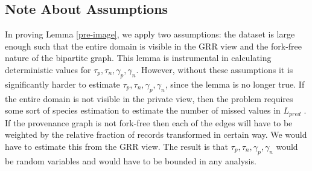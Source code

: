 \subsection{Note About Assumptions}
In proving Lemma \ref{pre-image}, we apply two assumptions: the dataset is large enough such that the entire domain is visible in the GRR view and the fork-free nature of the bipartite graph.
This lemma is instrumental in calculating deterministic values for $\tau_p,\tau_n,\gamma_p,\gamma_n$.
However, without these assumptions it is significantly harder to estimate $\tau_p,\tau_n,\gamma_p,\gamma_n$, since the lemma is no longer true.
If the entire domain is not visible in the private view, then the problem requires some sort of species estimation to estimate the number of missed values in $L_{pred}$ \cite{haas1995sampling}.
If the provenance graph is not fork-free then each of the edges will have to be weighted by the relative fraction of records transformed in certain way.
We would have to estimate this from the GRR view.
The result is that $\tau_p,\tau_n,\gamma_p,\gamma_n$ would be random variables and would have to be bounded in any analysis. 




